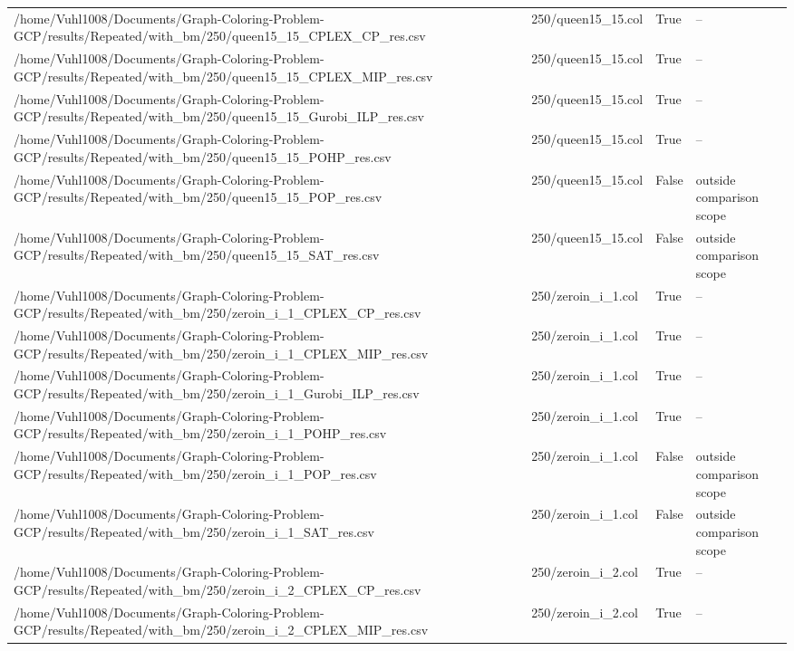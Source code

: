 \begin{table}[htbp]
\begin{tabular}{llll}
/home/Vuhl1008/Documents/Graph-Coloring-Problem-GCP/results/Repeated/with\_bm/250/queen15\_15\_CPLEX\_CP\_res.csv & 250/queen15\_15.col & True & -- \\
/home/Vuhl1008/Documents/Graph-Coloring-Problem-GCP/results/Repeated/with\_bm/250/queen15\_15\_CPLEX\_MIP\_res.csv & 250/queen15\_15.col & True & -- \\
/home/Vuhl1008/Documents/Graph-Coloring-Problem-GCP/results/Repeated/with\_bm/250/queen15\_15\_Gurobi\_ILP\_res.csv & 250/queen15\_15.col & True & -- \\
/home/Vuhl1008/Documents/Graph-Coloring-Problem-GCP/results/Repeated/with\_bm/250/queen15\_15\_POHP\_res.csv & 250/queen15\_15.col & True & -- \\
/home/Vuhl1008/Documents/Graph-Coloring-Problem-GCP/results/Repeated/with\_bm/250/queen15\_15\_POP\_res.csv & 250/queen15\_15.col & False & outside comparison scope \\
/home/Vuhl1008/Documents/Graph-Coloring-Problem-GCP/results/Repeated/with\_bm/250/queen15\_15\_SAT\_res.csv & 250/queen15\_15.col & False & outside comparison scope \\
/home/Vuhl1008/Documents/Graph-Coloring-Problem-GCP/results/Repeated/with\_bm/250/zeroin\_i\_1\_CPLEX\_CP\_res.csv & 250/zeroin\_i\_1.col & True & -- \\
/home/Vuhl1008/Documents/Graph-Coloring-Problem-GCP/results/Repeated/with\_bm/250/zeroin\_i\_1\_CPLEX\_MIP\_res.csv & 250/zeroin\_i\_1.col & True & -- \\
/home/Vuhl1008/Documents/Graph-Coloring-Problem-GCP/results/Repeated/with\_bm/250/zeroin\_i\_1\_Gurobi\_ILP\_res.csv & 250/zeroin\_i\_1.col & True & -- \\
/home/Vuhl1008/Documents/Graph-Coloring-Problem-GCP/results/Repeated/with\_bm/250/zeroin\_i\_1\_POHP\_res.csv & 250/zeroin\_i\_1.col & True & -- \\
/home/Vuhl1008/Documents/Graph-Coloring-Problem-GCP/results/Repeated/with\_bm/250/zeroin\_i\_1\_POP\_res.csv & 250/zeroin\_i\_1.col & False & outside comparison scope \\
/home/Vuhl1008/Documents/Graph-Coloring-Problem-GCP/results/Repeated/with\_bm/250/zeroin\_i\_1\_SAT\_res.csv & 250/zeroin\_i\_1.col & False & outside comparison scope \\
/home/Vuhl1008/Documents/Graph-Coloring-Problem-GCP/results/Repeated/with\_bm/250/zeroin\_i\_2\_CPLEX\_CP\_res.csv & 250/zeroin\_i\_2.col & True & -- \\
/home/Vuhl1008/Documents/Graph-Coloring-Problem-GCP/results/Repeated/with\_bm/250/zeroin\_i\_2\_CPLEX\_MIP\_res.csv & 250/zeroin\_i\_2.col & True & -- \\

\end{tabular}
\end{table}
